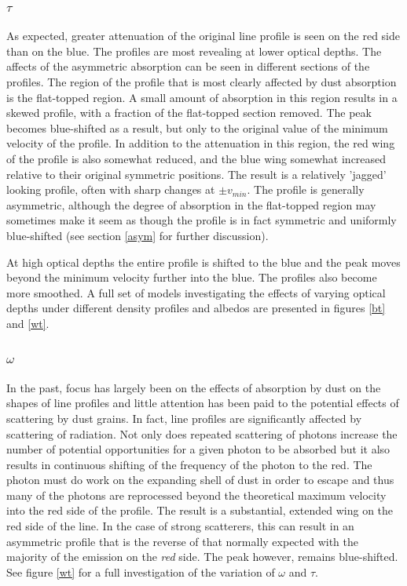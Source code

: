 \documentclass[useAMS,usenatbib,usegraphicx]{mnras}
\begin{document}
\subsubsection{$\tau$}
\label{tau}
As expected, greater attenuation of the original line profile is seen on the red side than on the blue.   The profiles are most revealing at lower optical depths.  The affects of the asymmetric absorption can be seen in different sections of the profiles.  The region of the profile that is most clearly affected by dust absorption is the flat-topped region.  A small amount of absorption in this region results in a skewed profile, with a fraction of the flat-topped section removed.  The peak becomes blue-shifted as a result, but only to the original value of the minimum velocity of the profile. In addition to the attenuation in this region, the red wing of the profile is also somewhat reduced, and the blue wing somewhat increased relative to their original symmetric positions.  The result is a relatively 'jagged' looking profile, often with sharp changes at $\pm v_{min}$.  The profile is generally asymmetric, although the degree of absorption in the flat-topped region may sometimes make it seem as though the profile is in fact symmetric and uniformly blue-shifted (see section \ref{asym} for further discussion).

At high optical depths the entire profile is shifted to the blue and the peak moves beyond the minimum velocity further into the blue.  The profiles also become more smoothed.  A full set of models investigating the effects of varying optical depths under different density profiles and albedos are presented in figures \ref{bt} and \ref{wt}.

\subsubsection{$\omega$}
\label{omega}
In the past, focus has largely been on the effects of absorption by dust on the shapes of line profiles and little attention has been paid to the potential effects of scattering by dust grains.  In fact, line profiles are significantly affected by scattering of radiation.  Not only does repeated scattering of photons increase the number of potential opportunities for a given photon to be absorbed but it also results in continuous shifting of the frequency of the photon to the red.   The photon must do work on the expanding shell of dust in order to escape and thus many of the photons are reprocessed beyond the theoretical maximum velocity into the red side of the profile.  The result is a substantial, extended wing on the red side of the line.  In the case of strong scatterers, this can result in an asymmetric profile that is the reverse of that normally expected with the majority of the emission on the \textit{red} side.  The peak however, remains blue-shifted.  See figure \ref{wt} for a full investigation of the variation of $\omega$ and $\tau$.
\end{document}
